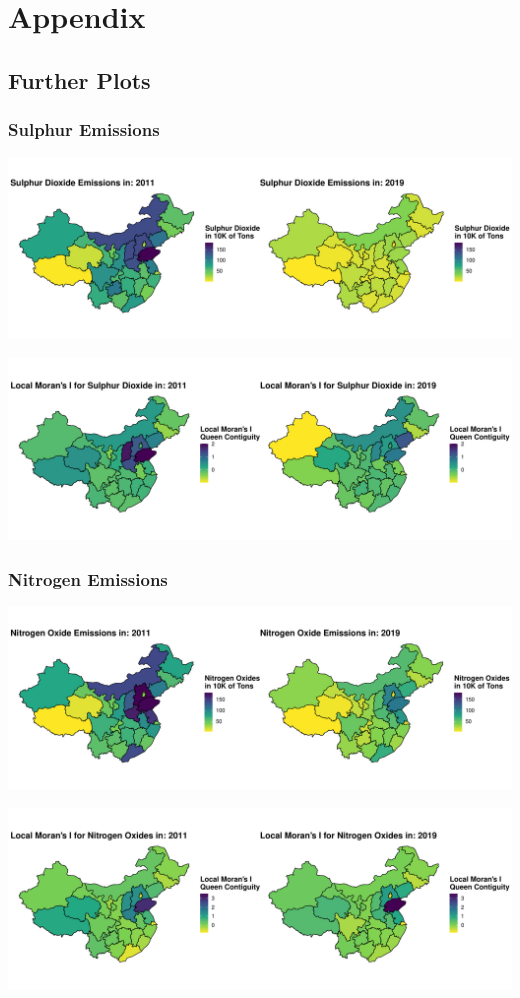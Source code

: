 \documentclass[
]{article}
\begin{document}
	

	\newpage
	\printbibliography[heading=bibintoc]
	\newpage
	\appendix
	\section{Appendix}
	\subsection{Further Plots}
	\subsubsection{Sulphur Emissions}
		\begin{center}
		\includegraphics[width = 440pt]{Waste_Gas_Emissions_Sulphur_comp.pdf} 
	\end{center}
	\begin{center}
		\includegraphics[width = 440pt]{Ii_Waste_Gas_Emissions_Sulphur_comp.pdf} 
	\end{center}
	\subsubsection{Nitrogen Emissions}
		\begin{center}
		\includegraphics[width = 440pt]{Waste_Gas_Emissions_Nitrogen_comp.pdf} 
	\end{center}
	\begin{center}
		\includegraphics[width = 440pt]{Ii_Waste_Gas_Emissions_Nitrogen_comp.pdf} 
	\end{center}
\end{document}
